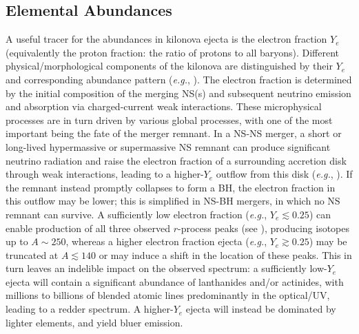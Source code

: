\documentclass[twocolumn, twocolappendix]{aastex63}
\def\eg{{\it e.g.}}
\begin{document}
\subsection{Elemental Abundances}\label{ssc:W18abunds}


A useful tracer for the abundances in kilonova ejecta is the electron fraction $Y_e$ (equivalently the proton fraction: the ratio of protons to all baryons). Different physical/morphological components of the kilonova are distinguished by their $Y_e$ and corresponding abundance pattern (\eg, \citealt{wanajo14, just15, mendoza-temis15, wu16}). The electron fraction is determined by the initial composition of the merging
NS(s) and subsequent neutrino emission and absorption via charged-current weak interactions. These microphysical processes are in turn driven by various global processes, with one of the most important being the fate of the merger remnant. In a NS-NS merger, a short or long-lived hypermassive or supermassive NS remnant can produce significant neutrino radiation and raise the electron fraction of a surrounding accretion disk through weak interactions, leading to a higher-$Y_e$ outflow from this disk (\eg, \citealt{metzger14, perego14, lippuner17, siegel18, fahlman18}). If the remnant instead promptly collapses to form a BH, the electron fraction in this outflow may be lower; this is simplified in NS-BH mergers, in which no NS remnant can survive. A sufficiently low electron fraction (\eg, $Y_e \lesssim 0.25$) can enable production of all three observed $r$-process peaks (see \citealt{cowan21}), producing isotopes up to $A \sim 250$, whereas a higher electron fraction ejecta (\eg, $Y_e \gtrsim 0.25$) may be truncated at $A \lesssim 140$ or may induce a shift in the location of these peaks. This in turn leaves an indelible impact on the observed spectrum: a sufficiently low-$Y_e$ ejecta will contain a significant abundance of lanthanides and/or actinides, with millions to billions of blended atomic lines predominantly in the optical/UV, leading to a redder spectrum. A higher-$Y_e$ ejecta will instead be dominated by lighter elements, and yield bluer emission.
\end{document}
